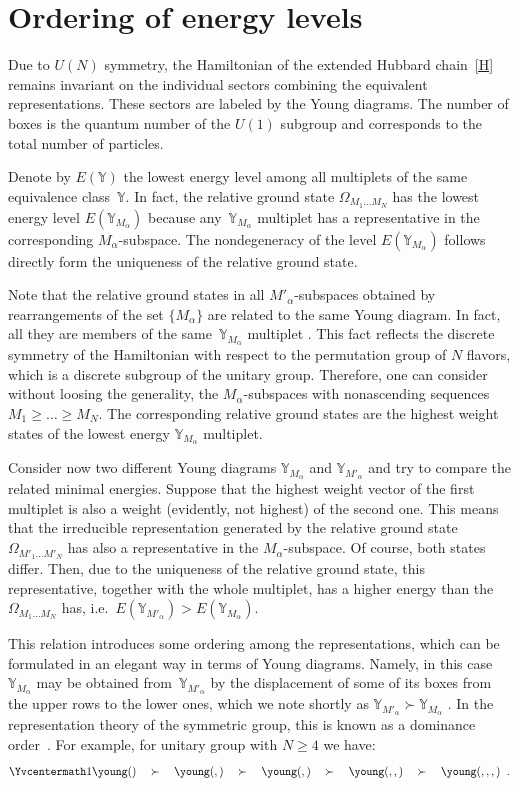 \documentclass[pdftex]{sigma}
\newcommand{\yn}{\mathbb{Y}}
\newcommand{\yc}{\Yvcentermath1}
\newcommand{\mb}{\mbox{}}
\begin{document}
\section{Ordering of energy levels}\label{section5}


Due to $U(N)$ symmetry, the Hamiltonian of the extended Hubbard chain~\eqref{H}
remains invariant on the individual sectors  combining the equivalent
representations. These sectors are labeled by the Young diagrams.
The number of boxes is the quantum number of the $U(1)$ subgroup and corresponds
to the total number of particles.

Denote by $E(\yn)$ the lowest energy level among
all  multiplets of the same equivalence class~$\yn$.
In fact, the relative ground state $\Omega_{M_1\dots M_N}$ has the lowest energy
level $E(\yn_{M_\alpha})$ because any~$\yn_{M_\alpha}$ multiplet has a representative
in the corresponding $M_\alpha$-subspace. The nondegeneracy of the level  $E(\yn_{M_\alpha})$
follows directly form the uniqueness of the relative ground state.

Note that the relative ground states in all $M'_{\alpha}$-subspaces obtained by
rearrangements of the set $\{M_\alpha\}$ are related to the same Young diagram.
In fact, all they are members of the same~$\yn_{M_\alpha}$ multiplet \cite{H04}.
This fact ref\/lects the discrete symmetry of the Hamiltonian  with  respect to
the permutation group of $N$ f\/lavors, which is a discrete subgroup of the unitary group.
Therefore, one can consider without loosing the generality, the $M_\alpha$-subspaces
with nonascending sequences $M_1\ge\dots\ge M_N$.
The corresponding relative ground states are the highest weight states of the
lowest energy $\yn_{M_\alpha}$ multiplet.

Consider now two dif\/ferent Young diagrams $\yn_{M_\alpha}$ and $\yn_{M'_\alpha}$
and try to compare the related minimal energies.
Suppose that  the highest weight vector of the f\/irst multiplet is also a weight (evidently, not
highest) of the second one.
This means that the irreducible representation generated by the relative
ground state  $\Omega_{M'_1\dots M'_N}$ has also a representative in the
$M_\alpha$-subspace. Of course, both states dif\/fer. Then, due to
the uniqueness of the relative ground state,  this representative, together
with the whole multiplet, has a higher energy  than the $\Omega_{M_1\dots M_N}$ has,
i.e.\
$E(\yn_{M'_\alpha})>E(\yn_{M_\alpha})$.

This relation introduces some ordering among the representations,
which can be formulated in an elegant way in terms
of  Young diagrams. Namely, in this case $\yn_{M_\alpha}$ may be obtained from~$\yn_{M'_\alpha}$ by the displacement of some of its boxes from the upper rows to the lower ones,
which we note shortly as $\yn_{M'_\alpha}\succ\yn_{M_\alpha}$ \cite{H04}.
In the representation theory of the symmetric group, this is known as a dominance
order~\cite{Mac}.
For example, for unitary group with $N\ge 4$ we have:
\[
{\yc
\young(\mb\mb\mb\mb) \quad \succ \quad
\young(\mb\mb\mb,\mb) \quad \succ \quad
\young(\mb\mb,\mb\mb)\quad \succ \quad
\young(\mb\mb,\mb,\mb) \quad \succ \quad
\young(\mb,\mb,\mb,\mb)
\;\; .
}
\]
\end{document}
